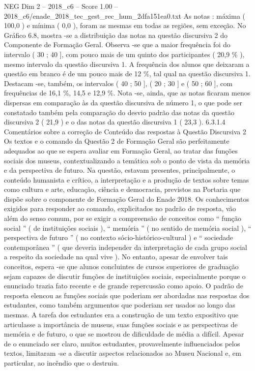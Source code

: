 \begin{textsample}{NEG Dim 2 – 2018\_c6 – Score 1.00 – 2018\_c6/enade\_2018\_tec\_gest\_rec\_hum\_2dfa151ea0.txt}
As notas : máxima ( 100,0 ) e mínima ( 0,0 ), foram as mesmas em todas as regiões, sem exceção.
No Gráfico 6.8, mostra -se a distribuição das notas na questão discursiva 2 do Componente de Formação Geral.
Observa -se que a maior frequência foi do intervalo ( 30 ; 40 ], com pouco mais de um quinto dos participantes ( 20,9 \% ), mesmo intervalo da questão discursiva 1.
A frequência dos alunos que deixaram a questão em branco é de um pouco mais de 12 \%, tal qual na questão discursiva 1.
Destacam -se, também, os intervalos ( 40 ; 50 ], ( 20 ; 30 ] e ( 50 ; 60 ], com frequências de 16,1 \%, 14,5 e 12,9 \%.
Nota -se, ainda, que as notas ficaram menos dispersas em comparação às da questão discursiva de número 1, o que pode ser constatado também pela comparação do desvio padrão das notas da questão discursiva 2 ( 21,9 ) e o das notas da questão discursiva 1 ( 23,3 ). 6.3.1.4 Comentários sobre a correção de Conteúdo das respostas à Questão Discursiva 2 Os textos e o comando da Questão 2 de Formação Geral são perfeitamente adequados ao que se espera avaliar em Formação Geral, ao tratar das funções sociais dos museus, contextualizando a temática sob o ponto de vista da memória e da perspectiva de futuro.
Na questão, estavam presentes, principalmente, o conteúdo humanista e crítico, a interpretação e a produção de textos sobre temas como cultura e arte, educação, ciência e democracia, previstos na Portaria que dispõe sobre o componente de Formação Geral do Enade 2018.
Os conhecimentos exigidos para responder ao comando, explicitados no padrão de resposta, vão além do senso comum, por se exigir a compreensão de conceitos como “ função social ” ( de instituições sociais ), “ memória ” ( no sentido de memória social ), “ perspectiva de futuro ” ( no contexto sócio-histórico-cultural ) e “ sociedade contemporânea ” ( que deveria independer da interpretação de cada grupo social a respeito da sociedade na qual vive ).
No entanto, apesar de envolver tais conceitos, espera -se que alunos concluintes de cursos superiores de graduação sejam capazes de discutir funções de instituições sociais, especialmente porque o enunciado trazia fato recente e de grande repercussão como apoio.
O padrão de resposta elencou as funções sociais que poderiam ser abordadas nas respostas dos estudantes, como também argumentos que poderiam ser usados ao longo das mesmas.
A tarefa dos estudantes era a construção de um texto expositivo que articulasse a importância de museus, suas funções sociais e as perspectivas de memória e de futuro, o que se mostrou de dificuldade de média a difícil.
Apesar de o enunciado ser claro, muitos estudantes, provavelmente influenciados pelos textos, limitaram -se a discutir aspectos relacionados ao Museu Nacional e, em particular, ao incêndio que o destruiu.

\end{textsample}
